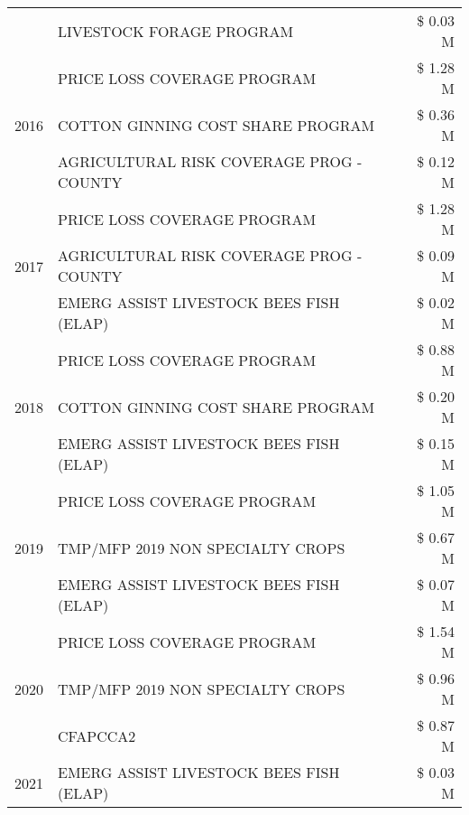 \begin{tabular}{llr}
 & LIVESTOCK FORAGE PROGRAM & \$ 0.03 M \\
\cline{1-3}
\multirow[t]{3}{*}{2016} & PRICE LOSS COVERAGE PROGRAM                   & \$ 1.28 M \\
 & COTTON GINNING COST SHARE PROGRAM             & \$ 0.36 M \\
 & AGRICULTURAL RISK COVERAGE PROG - COUNTY      & \$ 0.12 M \\
\cline{1-3}
\multirow[t]{3}{*}{2017} & PRICE LOSS COVERAGE PROGRAM & \$ 1.28 M \\
 & AGRICULTURAL RISK COVERAGE PROG - COUNTY & \$ 0.09 M \\
 & EMERG ASSIST LIVESTOCK BEES FISH (ELAP) & \$ 0.02 M \\
\cline{1-3}
\multirow[t]{3}{*}{2018} & PRICE LOSS COVERAGE PROGRAM & \$ 0.88 M \\
 & COTTON GINNING COST SHARE PROGRAM & \$ 0.20 M \\
 & EMERG ASSIST LIVESTOCK BEES FISH (ELAP) & \$ 0.15 M \\
\cline{1-3}
\multirow[t]{3}{*}{2019} & PRICE LOSS COVERAGE PROGRAM & \$ 1.05 M \\
 & TMP/MFP 2019 NON SPECIALTY CROPS & \$ 0.67 M \\
 & EMERG ASSIST LIVESTOCK BEES FISH (ELAP) & \$ 0.07 M \\
\cline{1-3}
\multirow[t]{3}{*}{2020} & PRICE LOSS COVERAGE PROGRAM & \$ 1.54 M \\
 & TMP/MFP 2019 NON SPECIALTY CROPS & \$ 0.96 M \\
 & CFAPCCA2 & \$ 0.87 M \\
\cline{1-3}
2021 & EMERG ASSIST LIVESTOCK BEES FISH (ELAP) & \$ 0.03 M \\
\cline{1-3}
\bottomrule
\end{tabular}
